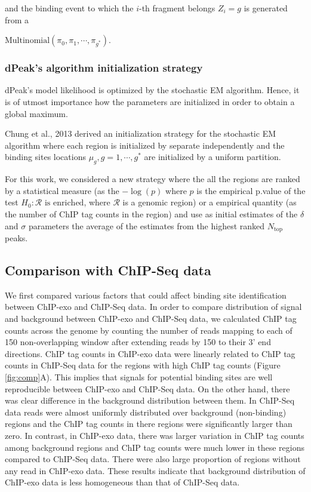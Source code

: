 \documentclass[11pt]{article}\usepackage[]{graphicx}\usepackage[]{color}
\begin{document}
and the binding event to which the $i$-th fragment belongs $Z_i = g$
is generated from a

$\mbox{Multinomial}(\pi_0,\pi_1,\cdots,\pi_{g^*})$.

\subsubsection{dPeak's algorithm initialization strategy}
\label{sec:algo}

dPeak's model likelihood is optimized by the stochastic EM
algorithm. Hence, it is of utmost importance how the parameters are
initialized in order to obtain a global maximum.

Chung et al., 2013 \cite{dpeak} derived an initialization strategy for
the stochastic EM algorithm where each region is initialized by
separate independently and the binding sites locations $\mu_g,
g=1,\cdots,g^*$ are initialized by a uniform partition.

For this work, we considered a new strategy where the all the regions
are ranked by a statistical measure (as the $-\log(p)$ where $p$ is
the empirical p.value of the test $H_0: \mathcal{R} \text{ is
  enriched}$, where $\mathcal{R}$ is a genomic region) or a empirical
quantity (as the number of ChIP tag counts in the region) and use as
initial estimates of the $\delta$ and $\sigma$ parameters the average
of the estimates from the highest ranked $N_{\text{top}}$ peaks.

\subsection{Comparison with ChIP-Seq data}
\label{sec:comp_chipseq}



We first compared various factors that could affect binding site
identification between ChIP-exo and ChIP-Seq data. In order to compare
distribution of signal and background between ChIP-exo and ChIP-Seq
data, we calculated ChIP tag counts across the genome by counting the
number of reads mapping to each of 150 non-overlapping
window after extending reads by 150 to their 3' end
directions. ChIP tag counts in ChIP-exo data were linearly related to
ChIP tag counts in ChIP-Seq data for the regions with high ChIP tag
counts (Figure \ref{fig:comp}A). This implies that signals for
potential binding sites are well reproducible between ChIP-exo and
ChIP-Seq data. On the other hand, there was clear difference in the
background distribution between them. In ChIP-Seq data reads were
almost uniformly distributed over background (non-binding) regions and
the ChIP tag counts in there regions were significantly larger than
zero. In contrast, in ChIP-exo data, there was larger variation in
ChIP tag counts among background regions and ChIP tag counts were much
lower in these regions compared to ChIP-Seq data. There were also
large proportion of regions without any read in ChIP-exo data. These
results indicate that background distribution of ChIP-exo data is less
homogeneous than that of ChIP-Seq data.
\end{document}
